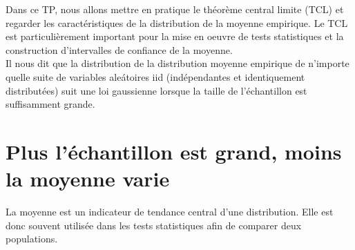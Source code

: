\documentclass[12pt,paper=a4,answers]{exam}
\begin{document}
Dans ce TP, nous allons mettre en pratique le {\color{blue} th\'eor\`eme central limite} (TCL) et regarder les caract\'eristiques de la distribution de la moyenne empirique. Le TCL est particuli\`erement important pour la mise en oeuvre de tests statistiques et la construction d'intervalles de confiance de la moyenne.\\
Il nous dit que la distribution de la distribution moyenne empirique de n'importe quelle suite de variables ale\'atoires iid (ind\'ependantes et identiquement distribut\'ees) suit une loi gaussienne lorsque la taille de l'\'echantillon est suffisamment grande.\\
\vspace{1ex}

\section{Plus l'\'echantillon est grand, moins la moyenne varie}
La moyenne est un indicateur de tendance central d'une distribution. Elle est donc souvent utilis\'ee dans les tests statistiques afin de comparer deux populations. 
\end{document}

